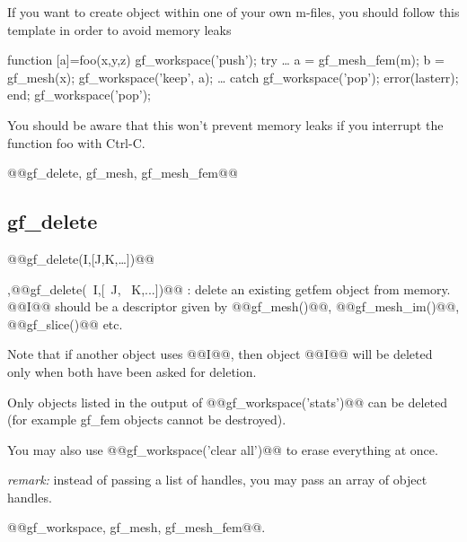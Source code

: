 \begin{cmdexamples}
If you want to create \gfm object within one of your own m-files,
you should follow this template in order to avoid memory leaks 
\begin{mcode}
function [a]=foo(x,y,z)
  gf_workspace('push');
  try
    \ldots                      %
    a = gf_mesh_fem(m);      %
    b = gf_mesh(x);
    gf_workspace('keep', a); %
    \ldots                       %
  catch
    gf_workspace('pop');     %
    error(lasterr);
  end;
  gf_workspace('pop');
\end{mcode}
You should be aware that this won't prevent memory leaks if you
interrupt the function foo with Ctrl-C.
\end{cmdexamples}
\begin{gfseealso}
  @@gf\_delete, gf\_mesh, gf\_mesh\_fem@@
\end{gfseealso}
\newpage


\subsection{gf\_delete}
\begin{synopsis}@@gf_delete(\thobj I,[\thobj J,\thobj K,\ldots])@@\end{synopsis}
\begin{cmddescription}
  \sep{@@gf\_delete(\thobj\ I,[\thobj\ J, \thobj\ K,...])@@} : delete
  an existing getfem object from memory. @@I@@ should be a descriptor
  given by @@gf_mesh()@@, @@gf_mesh_im()@@, @@gf_slice()@@ etc.

  Note that if another object uses @@I@@, then object @@I@@ will be deleted
  only when both have been asked for deletion.
  
  Only objects listed in the output of @@gf_workspace('stats')@@ can be
  deleted (for example gf_fem objects cannot be destroyed).
  
  You may also use @@gf_workspace('clear all')@@ to erase everything at
  once.

  \textit{remark:} instead of passing a list of handles, you may pass
  an array of object handles.
\end{cmddescription}
\begin{gfseealso}
  @@gf\_workspace, gf\_mesh, gf\_mesh\_fem@@.
\end{gfseealso}
\newpage

